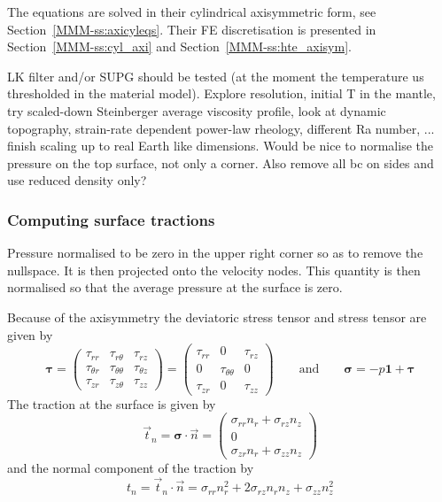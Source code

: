 The equations are solved in their cylindrical axisymmetric form, see
Section~\ref{MMM-ss:axicyleqs}. Their FE discretisation is presented in Section~\ref{MMM-ss:cyl_axi}
and Section~\ref{MMM-ss:hte_axisym}.


\begin{remark}
LK filter and/or SUPG should be tested (at the moment the temperature us thresholded in the 
material model). Explore resolution, initial T in the mantle, try scaled-down Steinberger average 
viscosity profile, look at dynamic topography, strain-rate dependent power-law rheology, different 
Ra number, ... finish scaling up to real Earth like dimensions.
Would be nice to normalise the pressure on the top surface, not only a corner.
Also remove all bc on sides and use reduced density only? 
\end{remark}

\subsubsection*{Computing surface tractions}

Pressure normalised to be zero in the upper right corner so as to remove the nullspace. 
It is then projected onto the velocity nodes. This quantity is then normalised so that 
the average pressure at the surface is zero. 

Because of the axisymmetry the deviatoric stress tensor and stress tensor 
are given by
\[
{\bm \tau} 
= 
\left(
\begin{array}{ccc}
\tau_{rr} & \tau_{r\theta} & \tau_{rz} \\
\tau_{\theta r} & \tau_{\theta \theta} & \tau_{\theta z} \\
\tau_{zr} & \tau_{z\theta} & \tau_{zz} 
\end{array}
\right)
=
\left(
\begin{array}{ccc}
\tau_{rr} & 0 & \tau_{rz} \\
0  & \tau_{\theta \theta} & 0 \\
\tau_{zr} & 0 & \tau_{zz} 
\end{array}
\right)
\qquad
\text{and}
\qquad
{\bm \sigma} = -p {\bm 1} + {\bm \tau}
\]
The traction at the surface is given by 
\[
\vec{t}_n 
= {\bm \sigma}\cdot \vec{n}
=
\left(
\begin{array}{c}
\sigma_{rr} n_r + \sigma_{rz} n_z \\
0 \\
\sigma_{zr} n_r + \sigma_{zz} n_z
\end{array}
\right)
\]
and the normal component of the traction by 
\[
t_n= \vec{t}_n \cdot \vec{n} = \sigma_{rr} n_r^2 + 2 \sigma_{rz} n_r n_z + \sigma_{zz} n_z^2
\]




